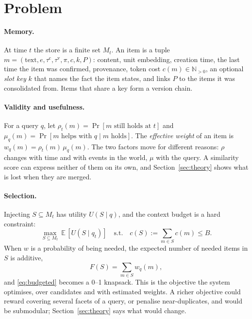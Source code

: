 \section{Problem}\label{sec:framework}

\paragraph{Memory.} At time $t$ the store is a finite set $M_t$. An item is a tuple $m=(\mathrm{text},e,\tau^{\mathrm{c}},\tau^{\mathrm{v}},\pi,c,k,P)$: content, unit embedding, creation time, the last time the item was confirmed, provenance, token cost $c(m)\in\mathbb{N}_{>0}$, an optional \emph{slot key} $k$ that names the fact the item states, and links $P$ to the items it was consolidated from. Items that share a key form a version chain.

\paragraph{Validity and usefulness.} For a query $q$, let $\rho_t(m)=\Pr[m \text{ still holds at } t]$ and $\mu_q(m)=\Pr[m\text{ helps with }q\mid m\text{ holds}]$. The \emph{effective weight} of an item is $w_q(m)=\rho_t(m)\,\mu_q(m)$. The two factors move for different reasons: $\rho$ changes with time and with events in the world, $\mu$ with the query. A similarity score can express neither of them on its own, and Section~\ref{sec:theory} shows what is lost when they are merged.

\paragraph{Selection.} Injecting $S\subseteq M_t$ has utility $U(S\mid q)$, and the context budget is a hard constraint:
\begin{equation}\label{eq:budgeted}
  \max_{S\subseteq M_t}\ \mathbb{E}\,[U(S\mid q_t)]\quad\text{s.t.}\quad c(S):=\sum_{m\in S}c(m)\le B .
\end{equation}
When $w$ is a probability of being needed, the expected number of needed items in $S$ is additive,
\begin{equation}\label{eq:objective}
  F(S)=\sum_{m\in S}w_q(m),
\end{equation}
and \eqref{eq:budgeted} becomes a 0--1 knapsack. This is the objective the system optimises, over candidates and with estimated weights. A richer objective could reward covering several facets of a query, or penalise near-duplicates, and would be submodular; Section~\ref{sec:theory} says what would change.

